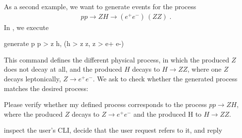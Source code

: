 \documentclass[submission, Phys]{SciPost}
\begin{document}
As a second example, we want to generate events for the process 
%
\begin{align}
    p p \to Z H 
    \to (e^+ e^-) \, (Z Z) \; .
\end{align}
%
In \mg, we execute
\begin{bashblock}
generate p p > z h, (h > z z, z > e+ e-)
\end{bashblock}
%
This command defines the different physical process, in which the produced $Z$ does not decay at all, and the produced $H$ decays to $H \to Z Z$, where one $Z$ decays leptonically, $Z \to e^+ e^-$. We ask \ma to check whether the generated process matches the desired process:
%
\begin{userblock}[User]
Please verify whether my defined process corresponds to the process $p p \to Z H$, where the produced $Z$ decays to $Z \to e^+ e^-$ and the produced H to $H \rightarrow Z Z$.
\end{userblock}
%
\ma inspect the user's CLI, decide that the user request refers to it, and reply
%
\end{document}
